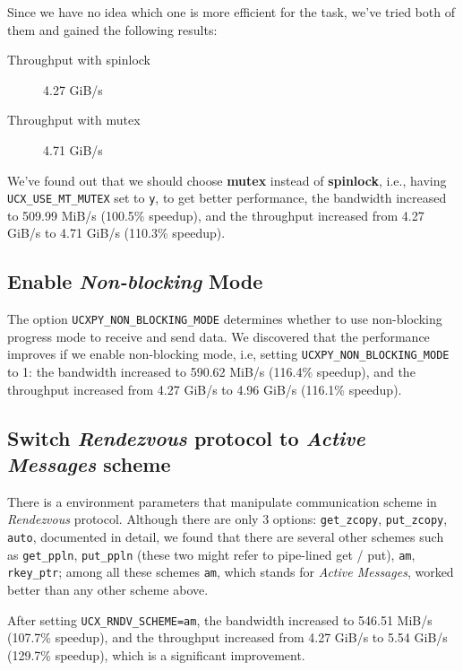 \documentclass{article}
\begin{document}
Since we have no idea which one is more efficient for the task, we've tried both of them and gained the following results:

\begin{description}
	\item[Throughput with spinlock] 4.27 GiB/s
	\item[Throughput with mutex] 4.71 GiB/s
\end{description}

We've found out that we should choose \textbf{mutex} instead of \textbf{spinlock}, i.e., having \texttt{UCX\_USE\_MT\_MUTEX} set to \texttt{y},  to get better performance, the bandwidth increased to 509.99 MiB/s (100.5\% speedup), and the throughput increased from 4.27 GiB/s to 4.71 GiB/s (110.3\% speedup).

\subsection{Enable \textit{Non-blocking} Mode}

The option \texttt{UCXPY\_NON\_BLOCKING\_MODE} determines whether to use non-blocking progress mode to receive and send data. We discovered that the performance improves if we enable non-blocking mode, i.e, setting \texttt{UCXPY\_NON\_BLOCKING\_MODE} to 1: the bandwidth increased to 590.62 MiB/s (116.4\% speedup), and the throughput increased from 4.27 GiB/s to 4.96 GiB/s (116.1\% speedup).

\subsection{Switch \textit{Rendezvous} protocol to \textit{Active Messages} scheme}

There is a environment parameters that manipulate communication scheme in \textit{Rendezvous} protocol. Although there are only 3 options:  \texttt{get\_zcopy}, \texttt{put\_zcopy}, \texttt{auto}, documented in detail, we found that there are several other schemes such as \texttt{get\_ppln}, \texttt{put\_ppln} (these two might refer to pipe-lined get / put), \texttt{am}, \texttt{rkey\_ptr}; among all these schemes \texttt{am}, which stands for \textit{Active Messages}, worked better than any other scheme above.

After setting \texttt{UCX\_RNDV\_SCHEME=am}, the bandwidth increased to 546.51 MiB/s (107.7\% speedup), and the throughput increased from 4.27 GiB/s to 5.54 GiB/s (129.7\% speedup), which is a significant improvement.
\end{document}
